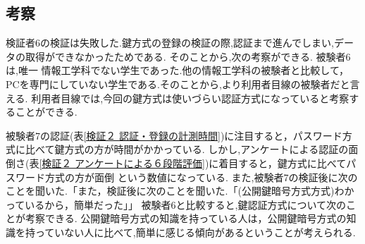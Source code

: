   \newpage

  \subsection{考察}
  検証者6の検証は失敗した.鍵方式の登録の検証の際,認証まで進んでしまい,データの取得ができなかったためである.
  そのことから,次の考察ができる.
    被験者6は,唯一 情報工学科でない学生であった.他の情報工学科の被験者と比較して，
    PCを専門にしていない学生である.そのことから,より利用者目線の被験者だと言える.
    利用者目線では,今回の鍵方式は使いづらい認証方式になっていると考察することができる.

    被験者7の認証(表\ref{検証２ 認証・登録の計測時間})に注目すると，パスワード方式に比べて鍵方式の方が時間がかかっている.
    しかし,アンケートによる認証の面倒さ(表\ref{検証２ アンケートによる６段階評価})に着目すると，鍵方式に比べてパスワード方式の方が面倒 という数値になっている.
    また,被験者7の検証後に次のことを聞いた.「また，検証後に次のことを聞いた.「(公開鍵暗号方式方式)わかっているから，簡単だった」」
    被験者6と比較すると,鍵認証方式について次のことが考察できる.
    公開鍵暗号方式の知識を持っている人は，公開鍵暗号方式の知識を持っていない人に比べて,簡単に感じる傾向があるということが考えられる.
